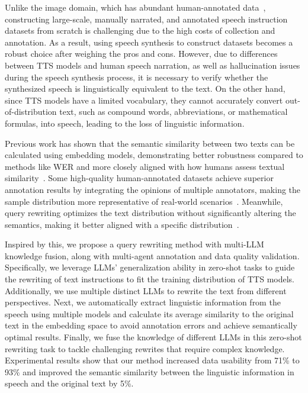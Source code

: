 \documentclass[11pt]{article}
\begin{document}
	
	Unlike the image domain, which has abundant human-annotated data~\citep{laurençon2024building,lin2015microsoftcococommonobjects}, constructing large-scale, manually narrated, and annotated speech instruction datasets from scratch is challenging due to the high costs of collection and annotation. 
	As a result, using speech synthesis to construct datasets becomes a robust choice after weighing the pros and cons. 
	However, due to differences between TTS models and human speech narration, as well as hallucination issues during the speech synthesis process, it is necessary to verify whether the synthesized speech is linguistically equivalent to the text. 
	On the other hand, since TTS models have a limited vocabulary, they cannot accurately convert out-of-distribution text, such as compound words, abbreviations, or mathematical formulas, into speech, leading to the loss of linguistic information.
	
	Previous work has shown that the semantic similarity between two texts can be calculated using embedding models, demonstrating better robustness compared to methods like WER and more closely aligned with how humans assess textual similarity~\citep{muennighoff2023mtebmassivetextembedding}. 
	Some high-quality human-annotated datasets achieve superior annotation results by integrating the opinions of multiple annotators, making the sample distribution more representative of real-world scenarios~\citep{deitke2024molmopixmoopenweights,liu2021emotionalsupportdialogsystems}. Meanwhile, query rewriting optimizes the text distribution without significantly altering the semantics, making it better aligned with a specific distribution~\citep{Ye2024BoostingCQ}.
	
	Inspired by this, we propose a query rewriting method with multi-LLM knowledge fusion, along with multi-agent annotation and data quality validation. 
	Specifically, we leverage LLMs' generalization ability in zero-shot tasks to guide the rewriting of text instructions to fit the training distribution of TTS models. 
	Additionally, we use multiple distinct LLMs to rewrite the text from different perspectives. 
	Next, we automatically extract linguistic information from the speech using multiple models and calculate its average similarity to the original text in the embedding space to avoid annotation errors and achieve semantically optimal results. 
	Finally, we fuse the knowledge of different LLMs in this zero-shot rewriting task to tackle challenging rewrites that require complex knowledge.
	Experimental results show that our method increased data usability from 71\% to 93\% and improved the semantic similarity between the linguistic information in speech and the original text by 5\%. 
\end{document}
